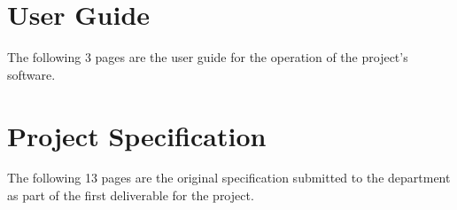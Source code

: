 \chapter{User Guide}
\label{app:user_guide}

The following 3 pages are the user guide for the operation of the project's software.



\chapter{Project Specification}
\label{app:old_spec}

The following 13 pages are the original specification submitted to the department as part of the first deliverable for the project.


